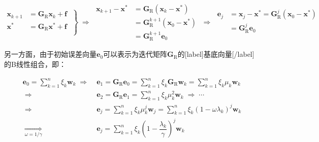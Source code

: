 \documentclass[12pt, UTF8, nofonts]{ctexart}
\begin{document}
\begin{equation}
  \label{eq:errorej}
  \left.\begin{aligned}
    \boldsymbol{x}_{k+1} &= \boldsymbol{G}_{\mathrm{R}}\boldsymbol{x}_k + \boldsymbol{f} \\
    \boldsymbol{x}^{\ast} &= \boldsymbol{G}_{\mathrm{R}}\boldsymbol{x}^{\ast} + \boldsymbol{f} \\
  \end{aligned}\;\right\} \;\Rightarrow\;
  \begin{aligned}
    \boldsymbol{x}_{k+1} - \boldsymbol{x}^{\ast} &= \boldsymbol{G}_{\mathrm{R}} (\boldsymbol{x}_k-\boldsymbol{x}^{\ast}) \\
    &= \boldsymbol{G}_{\mathrm{R}}^{k+1} (\boldsymbol{x}_0-\boldsymbol{x}^{\ast}) \\
    &= \boldsymbol{G}_{\mathrm{R}}^{k+1}\boldsymbol{e}_0
  \end{aligned} \;\Rightarrow\;
  \begin{aligned}
    \boldsymbol{e}_j &= \boldsymbol{x}_j-\boldsymbol{x}^{\ast} = \boldsymbol{G}_{\mathrm{R}}^{j}(\boldsymbol{x}_0-\boldsymbol{x}^{\ast}) \\
    &= \boldsymbol{G}_{\mathrm{R}}^j\boldsymbol{e}_0 \\
  \end{aligned}
\end{equation}

另一方面，由于初始误差向量$\boldsymbol{e}_0$可以表示为迭代矩阵$\boldsymbol{G}_{\mathrm{R}}$的[label]基底向量[/label]的B线性组合，即：

\begin{equation}
  \label{eq:ejexpand}
  \begin{aligned}
    \boldsymbol{e}_0 = \sum_{k=1}^n \xi_k\boldsymbol{w}_k \;\Longrightarrow&\;
    \boldsymbol{e}_1 = \boldsymbol{G}_{\mathrm{R}}\boldsymbol{e}_0 = \sum_{k=1}^n \xi_k\boldsymbol{G}_{\mathrm{R}}\boldsymbol{w}_k = \sum_{k=1}^n \xi_k\mu_k\boldsymbol{w}_k \\
    \;\Longrightarrow&\; \boldsymbol{e}_2 = \boldsymbol{G}_{\mathrm{R}} \boldsymbol{e}_1 = \sum_{k=1}^n \xi_k \mu_k^2 \boldsymbol{w}_k \;\Longrightarrow\; \cdots \\
    \;\Longrightarrow&\; \boldsymbol{e}_j = \sum_{k=1}^n \xi_k \mu_k^j \boldsymbol{w}_j = \sum_{k=1}^n \xi_k \left(1-\omega\lambda_k\right)^j \boldsymbol{w}_k \\
    \;\underset{\omega=1/\gamma}{\Longrightarrow}&\; \boldsymbol{e}_j = \sum_{k=1}^n \xi_k \left(1-\dfrac{\lambda_k}{\gamma}\right)^j \boldsymbol{w}_k
  \end{aligned}
\end{equation}
\end{document}
